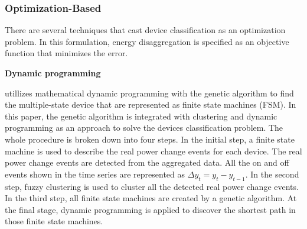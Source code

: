 \subsubsection{Optimization-Based}
There are several techniques that cast device classification as an optimization problem. In this formulation, energy disaggregation is specified as an objective function that minimizes the error.



\textbf{Dynamic programming}

\cite{baranski2004detecting} utillizes mathematical dynamic programming
with the genetic algorithm to find the multiple-state device that are represented as finite state machines (FSM).
In this paper, 
the genetic algorithm is integrated with clustering and 
dynamic programming as an approach to solve the devices classification 
problem.%
The whole procedure is broken down into four steps. 
In the initial step, a finite state machine is used to describe the real power change events for each device.
The real power change events are detected from the aggregated data. 
All the on and off events shown in the time series 
are represented as $\Delta y_t =y_t - y_{t-1}$.
In the second step, fuzzy clustering is used to cluster all the 
detected real power change events. 
In the third step, all finite state machines are 
created by a genetic algorithm. 
At the final stage, dynamic programming is applied to 
discover the shortest path in those finite state machines. 


